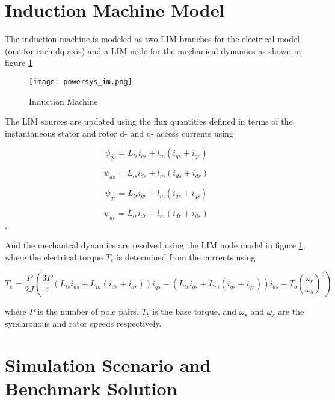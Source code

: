 \section{Induction Machine Model}

The induction machine is modeled as two LIM branches for the electrical model (one for each dq axis) and a LIM node for the mechanical dynamics as shown in figure \ref{fig:powersys_im}

\begin{figure}[h]
    \label{fig:powersys_im}
    \centering
    \texttt{[image: powersys\_im.png]}
    \caption{Induction Machine}
\end{figure}

The LIM sources are updated using the flux quantities defined in terms of the instantaneous stator and rotor d- and q- access currents using

\begin{equation}
    \psi_{qs} = L_{ls} i_{qs} + l_m (i_{qs} + i_{qr} )
\end{equation}

\begin{equation}
    \psi_{ds} = L_{ls} i_{ds} + l_m (i_{ds} + i_{dr} )
\end{equation}

\begin{equation}
    \psi_{qr} = L_{lr} i_{qr} + l_m (i_{qr} + i_{qs} )
\end{equation}

\begin{equation}
    \psi_{dr} = L_{lr} i_{dr} + l_m (i_{dr} + i_{ds} )
\end{equation},

And the mechanical dynamics are resolved using the LIM node model in figure \ref{fig:powersys_im}, where the electrical torque $T_e$ is determined from the currents using

\begin{equation}
    T_e = \frac{P}{2J} \left(
    \frac{3P}{4} \left( L_{ls} i_{ds} + L_m
    \left( i_{ds} + i_{dr} \right)\right)
    i_{qs} - \left(L_{ls} i_{qs} + L_m
    \left(i_{qs} + i_{qr} \right)\right)
    i_{ds}-T_b \left( \frac{\omega_r}{\omega_s}
    \right)^3 \right)
\end{equation}

where $P$ is the number of pole pairs, $T_b$ is the base torque, and $\omega_s$ and $\omega_r$ are the synchronous and rotor speeds respectively. 

\section{Simulation Scenario and Benchmark Solution}


